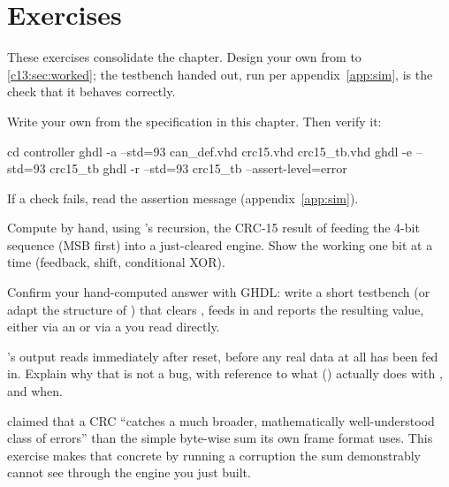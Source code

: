 
\section{Exercises}
\label{c13:sec:exercises}

\begin{aside}
These exercises consolidate the chapter. Design your own  from
 to \ref{c13:sec:worked}; the testbench handed out, run per
appendix~\ref{app:sim}, is the check that it behaves correctly.
\end{aside}

\label{c13:ex:crc15}
Write your own  from the specification in this chapter. Then verify it:

\begin{shell}
cd controller
ghdl -a --std=93 can_def.vhd crc15.vhd crc15_tb.vhd
ghdl -e --std=93 crc15_tb
ghdl -r --std=93 crc15_tb --assert-level=error
\end{shell}

If a check fails, read the assertion message (appendix~\ref{app:sim}).

\label{c13:ex:byhand}
 Compute by hand, using 's recursion, the CRC-15 result of feeding
the 4-bit sequence  (MSB first) into a just-cleared engine. Show the working one bit at a
time (feedback, shift, conditional XOR).

 Confirm your hand-computed answer with GHDL: write a short testbench (or adapt the
structure of ) that clears , feeds in  and reports the
resulting  value, either via an  or via a
 you read directly.

 's output  reads  immediately after reset, before any
real data at all has been fed in. Explain why that is not a bug, with reference to what
 () actually does with , and when.

\label{c13:ex:missed}
 claimed that a CRC ``catches a much broader, mathematically well-understood
class of errors'' than the simple byte-wise sum its own frame format uses. This exercise makes that
concrete by running a corruption the sum demonstrably cannot see through the engine you just built.

